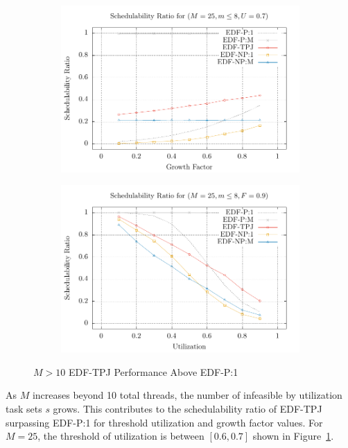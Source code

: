 \begin{figure}[ht]
  \centering
  \begin{subfigure}[t]{\cwidth}
    \includegraphics[width=\linewidth]{plot/2D-UFS/2D-M025m08U0_7xS}%
  \end{subfigure}%
  \begin{subfigure}[t]{\cwidth}
    \includegraphics[width=\linewidth]{plot/2D-UFS/2D-M025m08F0_9xS}%
  \end{subfigure}%
  \caption{${M > 10}$ EDF-TPJ Performance Above EDF-P:1}
  \label{fig:m25-tpj}
\end{figure}

As ${M}$ increases beyond 10 total threads, the number of infeasible
by utilization task sets ${s}$ grows. This contributes to the
schedulability ratio of EDF-TPJ surpassing EDF-P:1 for
threshold utilization and growth factor values. For ${M = 25}$, the
threshold of utilization is between ${[0.6,0.7]}$ shown in
Figure~\ref{fig:m25-tpj}.

